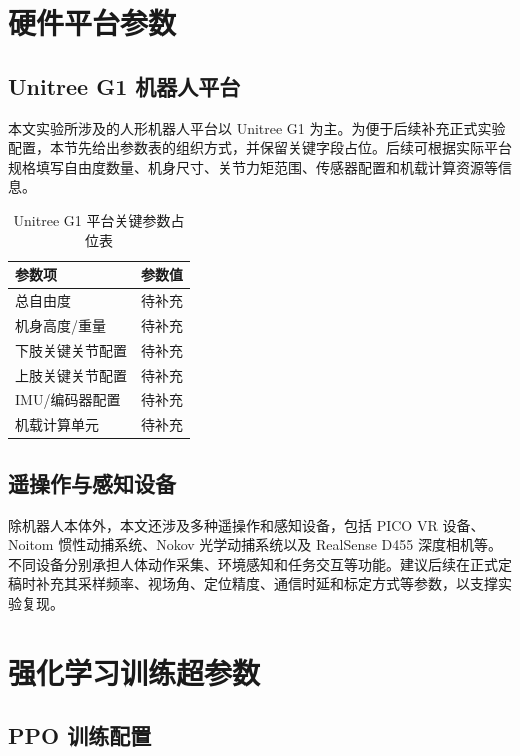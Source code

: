 
\chapter{硬件平台参数}

\section{Unitree G1 机器人平台}

本文实验所涉及的人形机器人平台以 Unitree G1 为主。为便于后续补充正式实验配置，本节先给出参数表的组织方式，并保留关键字段占位。后续可根据实际平台规格填写自由度数量、机身尺寸、关节力矩范围、传感器配置和机载计算资源等信息。

\begin{table}[htbp]
  \centering
  \caption{Unitree G1 平台关键参数占位表}
  \begin{tabular}{ll}
    \toprule
    参数项 & 参数值 \\
    \midrule
    总自由度 & 待补充 \\
    机身高度/重量 & 待补充 \\
    下肢关键关节配置 & 待补充 \\
    上肢关键关节配置 & 待补充 \\
    IMU/编码器配置 & 待补充 \\
    机载计算单元 & 待补充 \\
    \bottomrule
  \end{tabular}
\end{table}

\section{遥操作与感知设备}

除机器人本体外，本文还涉及多种遥操作和感知设备，包括 PICO VR 设备、Noitom 惯性动捕系统、Nokov 光学动捕系统以及 RealSense D455 深度相机等。不同设备分别承担人体动作采集、环境感知和任务交互等功能。建议后续在正式定稿时补充其采样频率、视场角、定位精度、通信时延和标定方式等参数，以支撑实验复现。

\chapter{强化学习训练超参数}

\section{PPO 训练配置}

